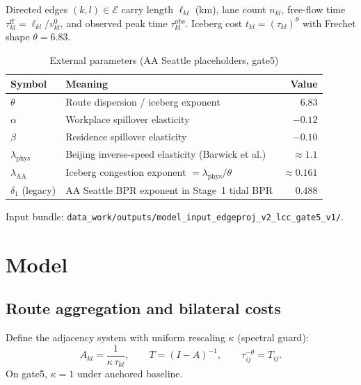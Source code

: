 \documentclass[12pt]{article}
\newcommand{\E}{\mathcal E}
\newcommand{\obs}{\mathrm{obs}}
\newcommand{\ff}{\mathrm{ff}}
\begin{document}
Directed edges $(k,l)\in\E$ carry length $\ell_{kl}$ (km), lane count $n_{kl}$,
free-flow time $\tau^{\ff}_{kl}=\ell_{kl}/v^0_{kl}$, and observed peak time
$\tau^{\obs}_{kl}$.
Iceberg cost $t_{kl}=(\tau_{kl})^{\theta}$ with Frechet shape $\theta=6.83$.

\begin{table}[htbp]
  \centering
  \caption{External parameters (AA Seattle placeholders, gate5)}
  \begin{tabular}{llr}
  \toprule
  Symbol & Meaning & Value \\
  \midrule
  $\theta$ & Route dispersion / iceberg exponent & $6.83$ \\
  $\alpha$ & Workplace spillover elasticity & $-0.12$ \\
  $\beta$  & Residence spillover elasticity & $-0.10$ \\
  $\lambda_{\mathrm{phys}}$ & Beijing inverse-speed elasticity (Barwick et al.) & $\approx 1.1$ \\
  $\lambda_{\mathrm{AA}}$ & Iceberg congestion exponent $=\lambda_{\mathrm{phys}}/\theta$ & $\approx 0.161$ \\
  $\delta_1$ (legacy) & AA Seattle BPR exponent in Stage~1 tidal BPR & $0.488$ \\
  \bottomrule
  \end{tabular}
\end{table}

Input bundle:
\texttt{data\_work/outputs/model\_input\_edgeproj\_v2\_lcc\_gate5\_v1/}.

\section{Model}\label{sec:model}

\subsection{Route aggregation and bilateral costs}

Define the adjacency system with uniform rescaling $\kappa$ (spectral guard):
\begin{equation}
  A_{kl} = \frac{1}{\kappa\,\tau_{kl}},
  \qquad
  T = (I-A)^{-1},
  \qquad
  \tau_{ij}^{-\theta} = T_{ij}.
  \label{eq:route_agg}
\end{equation}
On gate5, $\kappa=1$ under anchored baseline.
\end{document}
